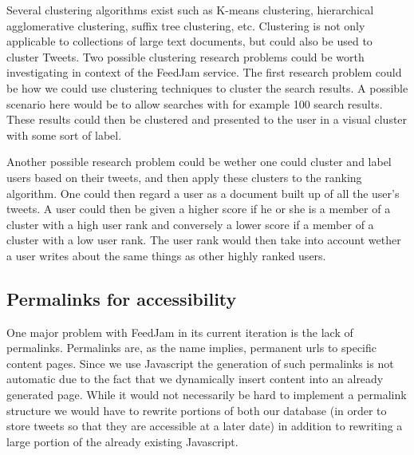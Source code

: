 Several clustering algorithms exist such as K-means clustering, hierarchical agglomerative clustering, suffix tree clustering, etc. \cite{Baeza-Yates2011} Clustering is not only applicable to collections of large text documents, but could also be used to cluster Tweets. Two possible clustering research problems could be worth investigating in context of the FeedJam service. The first research problem could be how we could use clustering techniques to cluster the search results. A possible scenario here would be to allow searches with for example 100 search results. These results could then be clustered and presented to the user in a visual cluster with some sort of label.

Another possible research problem could be wether one could cluster and label users based on their tweets, and then apply these clusters to the ranking algorithm. One could then regard a user as a document built up of all the user's tweets. A user could then be given a higher score if he or she is a member of a cluster with a high user rank and conversely a lower score if a member of a cluster with a low user rank. The user rank would then take into account wether a user writes about the same things as other highly ranked users.


\subsection{Permalinks for accessibility}
One major problem with FeedJam in its current iteration is the lack of permalinks. Permalinks are, as the name implies, permanent urls to specific content pages. Since we use Javascript the generation of such permalinks is not automatic due to the fact that we dynamically insert content into an already generated page. While it would not necessarily be hard to implement a permalink structure we would have to rewrite portions of both our database (in order to store tweets so that they are accessible at a later date) in addition to rewriting a large portion of the already existing Javascript.